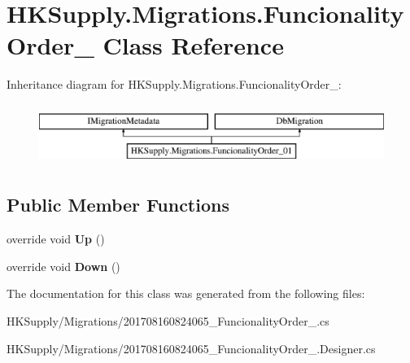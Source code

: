\hypertarget{class_h_k_supply_1_1_migrations_1_1_funcionality_order__01}{}\section{H\+K\+Supply.\+Migrations.\+Funcionality\+Order\+\_ Class Reference}
\label{class_h_k_supply_1_1_migrations_1_1_funcionality_order__01}
Inheritance diagram for H\+K\+Supply.\+Migrations.\+Funcionality\+Order\+\_\+:\begin{figure}[H]
\begin{center}
\leavevmode
\includegraphics[height=2.000000cm]{class_h_k_supply_1_1_migrations_1_1_funcionality_order__01}
\end{center}
\end{figure}
\subsection*{Public Member Functions}
\begin{DoxyCompactItemize}
\item 
\mbox{\label{class_h_k_supply_1_1_migrations_1_1_funcionality_order__01_ab957c9b8bcc3c6388802a05b6b7d10bb}} 
override void {\bfseries Up} ()
\item 
\mbox{\label{class_h_k_supply_1_1_migrations_1_1_funcionality_order__01_a9b4409b75cbd95eed8b5bb750e505745}} 
override void {\bfseries Down} ()
\end{DoxyCompactItemize}


The documentation for this class was generated from the following files\+:\begin{DoxyCompactItemize}
\item 
H\+K\+Supply/\+Migrations/201708160824065\+\_\+\+Funcionality\+Order\+\_.\+cs\item 
H\+K\+Supply/\+Migrations/201708160824065\+\_\+\+Funcionality\+Order\+\_.\+Designer.\+cs\end{DoxyCompactItemize}
